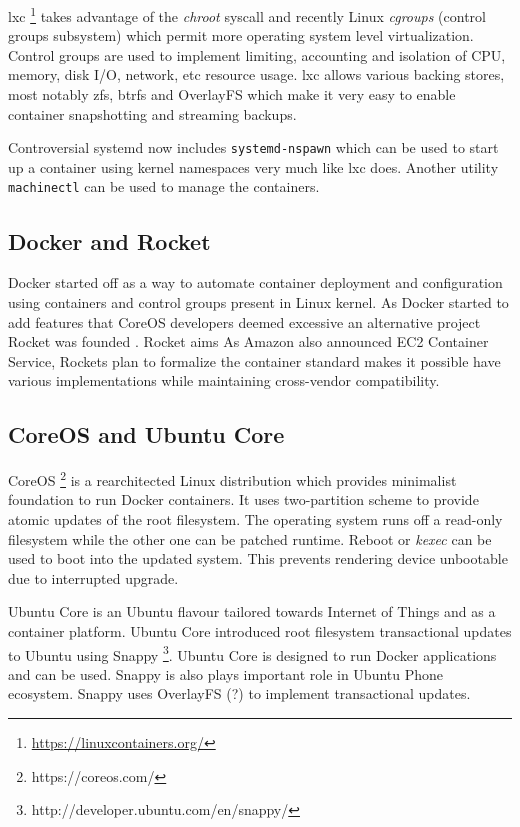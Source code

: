 \documentclass[a4paper,11pt]{kth-mag}
\begin{document}
\acrfull{lxc}
\footnote{\url{https://linuxcontainers.org/}}
takes advantage of the \emph{chroot} syscall and
recently Linux \emph{cgroups} (control groups subsystem) which permit
more  operating system level virtualization.
Control groups are used to implement limiting, accounting
and isolation of CPU, memory, disk I/O, network, etc resource usage.
\acrshort{lxc} allows various backing stores, most notably \acrshort{zfs}, \acrshort{btrfs} and
OverlayFS which make it very easy to enable container
snapshotting and streaming backups.

Controversial systemd now includes \lstinline!systemd-nspawn!
which can be used to start up a container using kernel namespaces
very much like \acrshort{lxc} does. Another utility \lstinline!machinectl!
can be used to manage the containers.
\cite{systemd-nspawn}

\subsection{Docker and Rocket}

Docker started off as a way to automate container deployment and
configuration using containers and control groups present in Linux
kernel. As Docker started to add features that CoreOS developers
deemed excessive an alternative project Rocket was founded
\cite{rocket}.
Rocket aims
As Amazon also announced EC2 Container Service,
Rockets plan to formalize the container standard
makes it possible have various implementations while
maintaining cross-vendor compatibility.

\subsection{CoreOS and Ubuntu Core}

CoreOS \footnote{https://coreos.com/} is a rearchitected Linux
distribution which provides minimalist foundation to run Docker containers.
It uses two-partition scheme to provide atomic updates of the root
filesystem. The operating system runs off a read-only filesystem
while the other one can be patched runtime. Reboot or \emph{kexec}
can be used to boot into the updated system. This prevents rendering
device unbootable due to interrupted upgrade.

Ubuntu Core is an Ubuntu flavour tailored towards Internet of Things
and as a container platform. Ubuntu Core introduced root filesystem
transactional updates to Ubuntu using Snappy
\footnote{http://developer.ubuntu.com/en/snappy/}.
Ubuntu Core is designed to run Docker applications and can be used.
Snappy is also plays important role in Ubuntu Phone ecosystem.
Snappy uses OverlayFS (?) to implement transactional updates.
\end{document}
